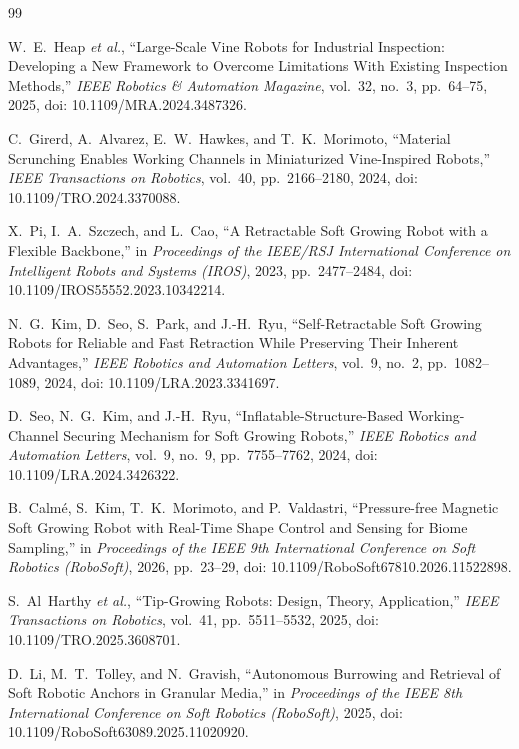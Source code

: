 \clearpage
{}
{}
\renewcommand{\bibname}{REFERENCES}
\begin{thebibliography}{99}

W.~E.~Heap \textit{et al.}, ``Large-Scale Vine Robots for Industrial Inspection: Developing a New Framework to Overcome Limitations With Existing Inspection Methods,'' \textit{IEEE Robotics \& Automation Magazine}, vol.~32, no.~3, pp.~64--75, 2025, doi: 10.1109/MRA.2024.3487326.

C.~Girerd, A.~Alvarez, E.~W.~Hawkes, and T.~K.~Morimoto, ``Material Scrunching Enables Working Channels in Miniaturized Vine-Inspired Robots,'' \textit{IEEE Transactions on Robotics}, vol.~40, pp.~2166--2180, 2024, doi: 10.1109/TRO.2024.3370088.

X.~Pi, I.~A.~Szczech, and L.~Cao, ``A Retractable Soft Growing Robot with a Flexible Backbone,'' in \textit{Proceedings of the IEEE/RSJ International Conference on Intelligent Robots and Systems (IROS)}, 2023, pp.~2477--2484, doi: 10.1109/IROS55552.2023.10342214.

N.~G.~Kim, D.~Seo, S.~Park, and J.-H.~Ryu, ``Self-Retractable Soft Growing Robots for Reliable and Fast Retraction While Preserving Their Inherent Advantages,'' \textit{IEEE Robotics and Automation Letters}, vol.~9, no.~2, pp.~1082--1089, 2024, doi: 10.1109/LRA.2023.3341697.

D.~Seo, N.~G.~Kim, and J.-H.~Ryu, ``Inflatable-Structure-Based Working-Channel Securing Mechanism for Soft Growing Robots,'' \textit{IEEE Robotics and Automation Letters}, vol.~9, no.~9, pp.~7755--7762, 2024, doi: 10.1109/LRA.2024.3426322.

B.~Calm\'e, S.~Kim, T.~K.~Morimoto, and P.~Valdastri, ``Pressure-free Magnetic Soft Growing Robot with Real-Time Shape Control and Sensing for Biome Sampling,'' in \textit{Proceedings of the IEEE 9th International Conference on Soft Robotics (RoboSoft)}, 2026, pp.~23--29, doi: 10.1109/RoboSoft67810.2026.11522898.

S.~Al~Harthy \textit{et al.}, ``Tip-Growing Robots: Design, Theory, Application,'' \textit{IEEE Transactions on Robotics}, vol.~41, pp.~5511--5532, 2025, doi: 10.1109/TRO.2025.3608701.

D.~Li, M.~T.~Tolley, and N.~Gravish, ``Autonomous Burrowing and Retrieval of Soft Robotic Anchors in Granular Media,'' in \textit{Proceedings of the IEEE 8th International Conference on Soft Robotics (RoboSoft)}, 2025, doi: 10.1109/RoboSoft63089.2025.11020920.


\end{thebibliography}

